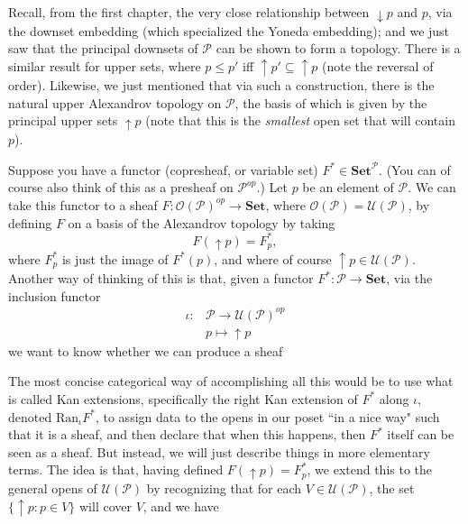 \documentclass[a4paper]{book}
\theoremstyle{definition}
\theoremstyle{definition}
\theoremstyle{definition}
\theoremstyle{theorem}
\theoremstyle{definition}
\begin{document}
Recall, from the first chapter, the very close relationship between $\downarrow p$ and $p$, via the downset embedding (which specialized the Yoneda embedding); and we just saw that the principal downsets of $\mathcal{P}$ can be shown to form a topology. There is a similar result for upper sets, where $p \leq p'$ iff $\uparrow p' \subseteq  \uparrow p$ (note the reversal of order). Likewise, we just mentioned that via such a construction, there is the natural upper Alexandrov topology on $\mathcal{P}$, the basis of which is given by the principal upper sets $\uparrow p$ (note that this is the \textit{smallest} open set that will contain $p$).\par  
Suppose you have a functor (copresheaf, or variable set) $F^* \in \textbf{Set}^{\mathcal{P}}$. (You can of course also think of this as a presheaf on $\mathcal{P}^{op}$.) Let $p$ be an element of $\mathcal{P}$. We can take this functor to a sheaf $F: \mathscr{O}(\mathcal{P})^{op} \rightarrow \textbf{Set}$, where $\mathscr{O}(\mathcal{P}) = \mathcal{U}(\mathcal{P})$, by defining $F$ on a basis of the Alexandrov topology by taking 
\begin{equation*}
F(\uparrow p) = F^*_p,
\end{equation*}
where $F^*_p$ is just the image of $F^*(p)$, and where of course $\uparrow p \in \mathcal{U}(\mathcal{P})$. Another way of thinking of this is that, given a functor $F^*: \mathcal{P} \rightarrow \textbf{Set}$, via the inclusion functor 
\begin{align*}
\iota: & \mathcal{P} \rightarrow \mathcal{U}(\mathcal{P})^{op} \\ 
&  p \mapsto \uparrow p
\end{align*} 
we want to know whether we can produce a sheaf 
\begin{center} 
\end{center} 
The most concise categorical way of accomplishing all this would be to use what is called Kan extensions, specifically the right Kan extension of $F^*$ along $\iota$, denoted $\text{Ran}_{\iota} F^*$, to assign data to the opens in our poset ``in a nice way" such that it is a sheaf, and then declare that when this happens, then $F^*$ itself can be seen as a sheaf. But instead, we will just describe things in more elementary terms. The idea is that, having defined $F(\uparrow p) = F^*_p$, we extend this to the general opens of $\mathcal{U}(\mathcal{P})$ by recognizing that for each $V \in \mathcal{U}(\mathcal{P})$, the set $\{\uparrow p: p \in V\}$ will cover $V$, and we have 
\end{document}
